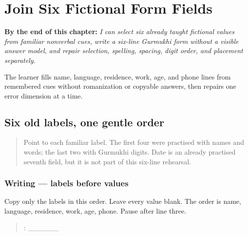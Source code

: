 
\chapter{Join Six Fictional Form Fields}
\label{ch:pa-form-six-field-checkpoint}

\begin{chapteropening}
\textbf{By the end of this chapter:} \emph{I can select six already taught fictional values from familiar nonverbal cues, write a six-line Gurmukhi form without a visible answer model, and repair selection, spelling, spacing, digit order, and placement separately.}

The learner fills name, language, residence, work, age, and phone lines from remembered cues without romanization or copyable answers, then repairs one error dimension at a time.
\end{chapteropening}

\section[\texorpdfstring{\pa{ਨਾਂ}: · \pa{ਭਾਸ਼ਾ} … (six familiar …)}{ਨਾਂ: · ਭਾਸ਼ਾ … (six familiar …)}]{Six old labels, one gentle order}

\label{lesson:PA-W11-form-six-order}



\begin{quote}
Point to each familiar label. The first four were practised with names and words; the last two with Gurmukhi digits. Date is an already practised seventh field, but it is not part of this six-line rehearsal.
\end{quote}

\subsection*{Writing — labels before values}
Copy only the labels in this order. Leave every value blank. The order is name, language, residence, work, age, phone. Pause after line three.

\begin{quote}
: \_\_\_\_\_\_
\end{quote}

